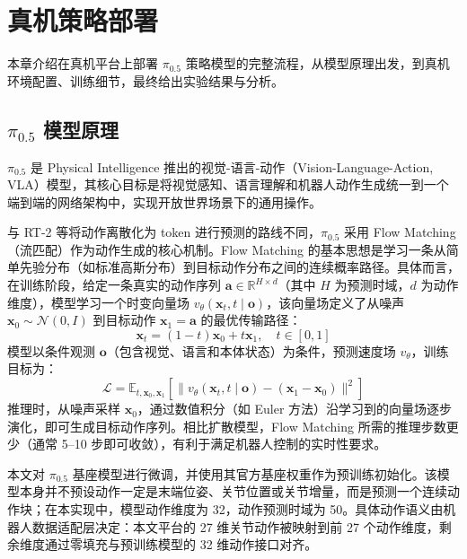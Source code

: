 \chapter{真机策略部署}\label{chap:policy}

本章介绍在真机平台上部署 $\pi_{0.5}$ 策略模型的完整流程，从模型原理出发，到真机环境配置、训练细节，最终给出实验结果与分析。

\section{$\pi_{0.5}$ 模型原理}

$\pi_{0.5}$ \citep{physicalintelligence2025pi05} 是 Physical Intelligence 推出的视觉-语言-动作（Vision-Language-Action, VLA）模型，其核心目标是将视觉感知、语言理解和机器人动作生成统一到一个端到端的网络架构中，实现开放世界场景下的通用操作。

与 RT-2 \citep{zitkovich2023rt2} 等将动作离散化为 token 进行预测的路线不同，$\pi_{0.5}$ 采用 Flow Matching（流匹配）作为动作生成的核心机制。Flow Matching 的基本思想是学习一条从简单先验分布（如标准高斯分布）到目标动作分布之间的连续概率路径。具体而言，在训练阶段，给定一条真实的动作序列 $\mathbf{a} \in \mathbb{R}^{H \times d}$（其中 $H$ 为预测时域，$d$ 为动作维度），模型学习一个时变向量场 $v_\theta(\mathbf{x}_t, t \mid \mathbf{o})$，该向量场定义了从噪声 $\mathbf{x}_0 \sim \mathcal{N}(0, I)$ 到目标动作 $\mathbf{x}_1 = \mathbf{a}$ 的最优传输路径：
\begin{equation}
    \mathbf{x}_t = (1-t)\mathbf{x}_0 + t\mathbf{x}_1, \quad t \in [0,1]
\end{equation}
模型以条件观测 $\mathbf{o}$（包含视觉、语言和本体状态）为条件，预测速度场 $v_\theta$，训练目标为：
\begin{equation}
    \mathcal{L} = \mathbb{E}_{t, \mathbf{x}_0, \mathbf{x}_1} \left[ \| v_\theta(\mathbf{x}_t, t \mid \mathbf{o}) - (\mathbf{x}_1 - \mathbf{x}_0) \|^2 \right]
\end{equation}
推理时，从噪声采样 $\mathbf{x}_0$，通过数值积分（如 Euler 方法）沿学习到的向量场逐步演化，即可生成目标动作序列。相比扩散模型，Flow Matching 所需的推理步数更少（通常 5--10 步即可收敛），有利于满足机器人控制的实时性要求。

本文对 $\pi_{0.5}$ 基座模型进行微调，并使用其官方基座权重作为预训练初始化。该模型本身并不预设动作一定是末端位姿、关节位置或关节增量，而是预测一个连续动作块；在本实现中，模型动作维度为 32，动作预测时域为 50。具体动作语义由机器人数据适配层决定：本文平台的 27 维关节动作被映射到前 27 个动作维度，剩余维度通过零填充与预训练模型的 32 维动作接口对齐。

